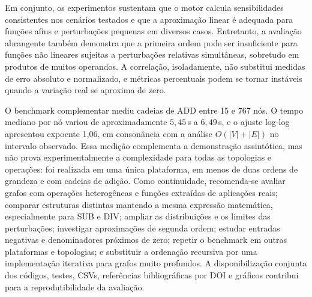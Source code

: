 \documentclass[12pt,openright,oneside,a4paper,brazil]{abntex2}
\begin{document}
Em conjunto, os experimentos sustentam que o motor calcula sensibilidades consistentes nos cenários testados e que a aproximação linear é adequada para funções afins e perturbações pequenas em diversos casos. Entretanto, a avaliação abrangente também demonstra que a primeira ordem pode ser insuficiente para funções não lineares sujeitas a perturbações relativas simultâneas, sobretudo em produtos de muitos operandos. A correlação, isoladamente, não substitui medidas de erro absoluto e normalizado, e métricas percentuais podem se tornar instáveis quando a variação real se aproxima de zero.

O benchmark complementar mediu cadeias de ADD entre 15 e 767 nós. O tempo mediano por nó variou de aproximadamente $5{,}45$\,\textmu s a $6{,}49$\,\textmu s, e o ajuste log-log apresentou expoente 1,06, em consonância com a análise $O(|V|+|E|)$ no intervalo observado. Essa medição complementa a demonstração assintótica, mas não prova experimentalmente a complexidade para todas as topologias e operações: foi realizada em uma única plataforma, em menos de duas ordens de grandeza e com cadeias de adição. Como continuidade, recomenda-se avaliar grafos com operações heterogêneas e funções extraídas de aplicações reais; comparar estruturas distintas mantendo a mesma expressão matemática, especialmente para SUB e DIV; ampliar as distribuições e os limites das perturbações; investigar aproximações de segunda ordem; estudar entradas negativas e denominadores próximos de zero; repetir o benchmark em outras plataformas e topologias; e substituir a ordenação recursiva por uma implementação iterativa para grafos muito profundos. A disponibilização conjunta dos códigos, testes, CSVs, referências bibliográficas por DOI e gráficos contribui para a reprodutibilidade da avaliação.

\postextual


\end{document}
